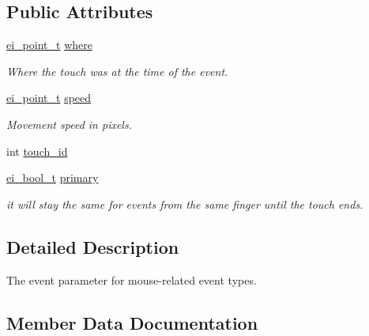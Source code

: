 \subsection*{Public Attributes}
\begin{DoxyCompactItemize}
\item 
\hyperlink{structei__point__t}{ei\+\_\+point\+\_\+t} \hyperlink{structei__touch__event__t_a396ee9581e6e58e3462da797516ae928}{where}\hypertarget{structei__touch__event__t_a396ee9581e6e58e3462da797516ae928}{}\label{structei__touch__event__t_a396ee9581e6e58e3462da797516ae928}

\begin{DoxyCompactList}\small\item\em Where the touch was at the time of the event. \end{DoxyCompactList}\item 
\hyperlink{structei__point__t}{ei\+\_\+point\+\_\+t} \hyperlink{structei__touch__event__t_af155f4e0e04c9a97ec519e1dbd5b1422}{speed}\hypertarget{structei__touch__event__t_af155f4e0e04c9a97ec519e1dbd5b1422}{}\label{structei__touch__event__t_af155f4e0e04c9a97ec519e1dbd5b1422}

\begin{DoxyCompactList}\small\item\em Movement speed in pixels. \end{DoxyCompactList}\item 
int \hyperlink{structei__touch__event__t_a328a41ee9952d545b22c78047eaf09f6}{touch\+\_\+id}
\item 
\hyperlink{ei__types_8h_a383b9af13bd6a0a893096ead3c4d8e28}{ei\+\_\+bool\+\_\+t} \hyperlink{structei__touch__event__t_ad1ac5fff1b97acd2ef179412a753a517}{primary}
\begin{DoxyCompactList}\small\item\em it will stay the same for events from the same finger until the touch ends. \end{DoxyCompactList}\end{DoxyCompactItemize}


\subsection{Detailed Description}
The event parameter for mouse-\/related event types. 

\subsection{Member Data Documentation}
